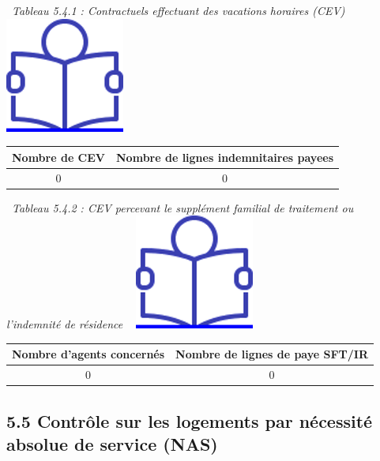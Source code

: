 ~\emph{Tableau 5.4.1 : Contractuels effectuant des vacations horaires
(CEV)} ~
\href{../Docs/Notices/fiche_CEV_horaires.odt}{\includegraphics{icones/Notice.png}}

\begin{longtable}[]{@{}cc@{}}
\toprule
Nombre de CEV & Nombre de lignes indemnitaires payees\tabularnewline
\midrule
\endhead
0 & 0\tabularnewline
\bottomrule
\end{longtable}

~\emph{Tableau 5.4.2 : CEV percevant le supplément familial de
traitement ou l'indemnité de résidence} ~
\href{../Docs/Notices/fiche_CEV_SFT.odt}{\includegraphics{icones/Notice.png}}

\begin{longtable}[]{@{}cc@{}}
\toprule
Nombre d'agents concernés & Nombre de lignes de paye
SFT/IR\tabularnewline
\midrule
\endhead
0 & 0\tabularnewline
\bottomrule
\end{longtable}

\hypertarget{controle-sur-les-logements-par-necessite-absolue-de-service-nas}{%
\subsection{5.5 Contrôle sur les logements par nécessité absolue de
service
(NAS)}\label{controle-sur-les-logements-par-necessite-absolue-de-service-nas}}


